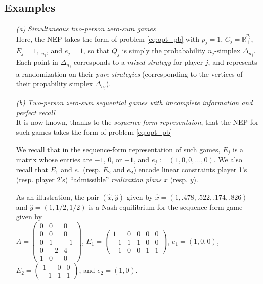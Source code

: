\documentclass[a4paper,9pt,journal]{IEEEtran}
\begin{document}
\subsection{Examples}
\label{subsec:example_games}
\begin{itemize}
\item[{\textit{(a)}}] \textit{Simultaneous two-person zero-sum games}\\
  Here, the NEP takes the form of problem \eqref{eq:opt_pb} with $p_j = 1$, $C_j = \mathbb{R}^{p_j}_+$, $E_j = 1_{1, n_j}$,
  and $e_j = 1$, so that $Q_j$ is simply the probabability $n_j$-simplex $\Delta_{n_j}$. Each point in $\Delta_{n_j}$ corresponds to a \textit{mixed-strategy} for player $j$,
and represents a randomization on their \textit{pure-strategies} (corresponding to the vertices of their propability simplex $\Delta_{n_j}$).
\item[{\textit{(b)}}] \textit{Two-person zero-sum sequential games with imcomplete information and perfect recall}\\
It is now known, thanks to the \textit{sequence-form representaion}, that the NEP for such games takes the form of problem \eqref{eq:opt_pb}

We recall that in the sequence-form representation of such games,  $E_j$ is a matrix whose
entries are $-1$, $0$, or $+1$, and $e_j := (1, 0, 0, ..., 0)$. We also recall that $E_1$ and $e_1$ (resp. $E_2$ and $e_2$)
encode linear constraints player 1's (resp. player 2's)  ``admissible'' \textit{realization plans} $x$ (resp. $y$).

As an illustration, the pair $(\hat{x}, \hat{y})$ given by
$\hat{x} = (1, .478, .522, .174, .826)$ and
$\hat{y} = (1, 1/2, 1/2)$ is a Nash equilibrium for the sequence-form game given by\\
$A = \left(\begin{array}{ccc}
0 & 0 & 0\\
0 & 0 & 0\\
0 & 1 & -1\\
0 & -2 & 4\\
1 & 0 & 0
\end{array}\right)$, $E_1 = \left(\begin{array}{ccccc}
  1 & 0 & 0 & 0 & 0\\
  -1 & 1 & 1 & 0 & 0\\
  -1 & 0 & 0 & 1 & 1
\end{array}\right)$,
$e_1 = (1, 0, 0)$, $E_2 = \left(\begin{array}{ccc}
  1 & 0 & 0\\
  -1 & 1 & 1
\end{array}\right)$, and $e_2 = (1, 0)$.
\end{itemize}
\end{document}
